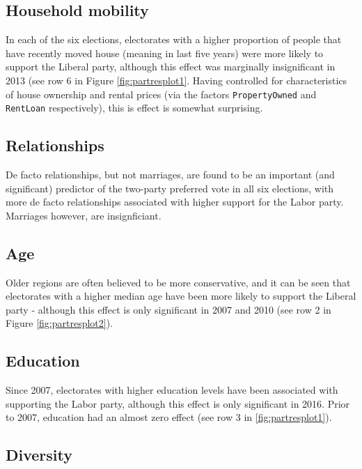 \documentclass[openany]{book}
\begin{document}
\hypertarget{household-mobility}{%
\subsection{Household mobility}\label{household-mobility}}

In each of the six elections, electorates with a higher proportion of people that have recently moved house (meaning in last five years) were more likely to support the Liberal party, although this effect was marginally insignificant in 2013 (see row 6 in Figure \ref{fig:partresplot1}. Having controlled for characteristics of house ownership and rental prices (via the factors \texttt{PropertyOwned} and \texttt{RentLoan} respectively), this is effect is somewhat surprising.

\hypertarget{relationships}{%
\subsection{Relationships}\label{relationships}}

De facto relationships, but not marriages, are found to be an important (and significant) predictor of the two-party preferred vote in all six elections, with more de facto relationships associated with higher support for the Labor party. Marriages however, are insignficiant.

\hypertarget{age}{%
\subsection{Age}\label{age}}

Older regions are often believed to be more conservative, and it can be seen that electorates with a higher median age have been more likely to support the Liberal party - although this effect is only significant in 2007 and 2010 (see row 2 in Figure \ref{fig:partresplot2}).

\hypertarget{education}{%
\subsection{Education}\label{education}}

Since 2007, electorates with higher education levels have been associated with supporting the Labor party, although this effect is only significant in 2016. Prior to 2007, education had an almost zero effect (see row 3 in \ref{fig:partresplot1}).

\hypertarget{diversity}{%
\subsection{Diversity}\label{diversity}}
\end{document}
